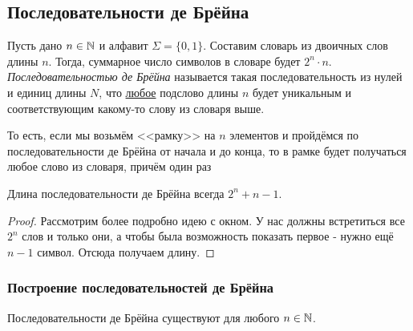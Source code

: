 \subsection{Последовательности де Брёйна}

\begin{definition}
	Пусть дано $n \in \mathbb{N}$ и алфавит $\Sigma = \{0, 1\}$. Составим словарь из двоичных слов длины $n$. Тогда, суммарное число символов в словаре будет $2^n \cdot n$. \textit{Последовательностью де Брёйна} называется такая последовательность из нулей и единиц длины $N$, что \underline{любое} подслово длины $n$ будет уникальным и соответствующим какому-то слову из словаря выше.
\end{definition}

\begin{note}
	То есть, если мы возьмём <<рамку>> на $n$ элементов и пройдёмся по последовательности де Брёйна от начала и до конца, то в рамке будет получаться любое слово из словаря, причём один раз
\end{note}

\begin{proposition}
	Длина последовательности де Брёйна всегда $2^n + n - 1$.
\end{proposition}

\begin{proof}
	Рассмотрим более подробно идею с окном. У нас должны встретиться все $2^n$ слов и только они, а чтобы была возможность показать первое - нужно ещё $n - 1$ символ. Отсюда получаем длину.
\end{proof}

\subsubsection*{Построение последовательностей де Брёйна}

\begin{theorem}
	Последовательности де Брёйна существуют для любого $n \in \mathbb{N}$.
\end{theorem}

